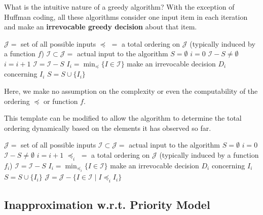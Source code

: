 What is the intuitive nature of a greedy algorithm? With the exception of Huffman coding, all these algorithms consider one input item in each iteration and make an \textbf{irrevocable greedy decision} about that item.

\begin{codebox}
    \li $\mathcal{J} =$ set of all possible inputs
    \li $\preceq\,\, = $ a total ordering on $\mathcal{J}$ (typically induced by a function $f$)
    \li $\mathcal{I} \subset \mathcal{J} = $ actual input to the algorithm
    \li $S = \emptyset$ 
    \li $i = 0$
    \li \While $\mathcal{I} - S \neq \emptyset$ \Do
        \li $i = i + 1$
        \li $\mathcal{I} = \mathcal{I} - S$
        \li $I_i = \min_{\preceq} \{ I \in \mathcal{I} \}$ 
        \li make an irrevocable decision $D_i$ concerning $I_i$ 
        \li $S = S \cup \{I_i\}$
    \End      
\end{codebox}

Here, we make no assumption on the complexity or even the computability of the ordering $\preceq$ or function $f$.

This template can be modified to allow the algorithm to determine the total ordering dynamically based on the elements it has observed so far.

\begin{codebox}
    \li $\mathcal{J} =$ set of all possible inputs
    \li $\mathcal{I} \subset \mathcal{J} = $ actual input to the algorithm
    \li $S = \emptyset$ 
    \li $i = 0$
    \li \While $\mathcal{I} - S \neq \emptyset$ \Do
        \li $i = i + 1$
        \li $\preceq_i\,\, = $ a total ordering on $\mathcal{J}$ (typically induced by a function $f_i$)
        \li $\mathcal{I} = \mathcal{I} - S$
        \li $I_i = \min_{\preceq_i} \{ I \in \mathcal{I} \}$ 
        \li make an irrevocable decision $D_i$ concerning $I_i$ 
        \li $S = S \cup \{I_i\}$
        \li $\mathcal{J} = \mathcal{J} - \{I \in \mathcal{I} \mid I \preceq_i I_i \}$
    \End      
\end{codebox}

\subsection{Inapproximation w.r.t. Priority Model}

